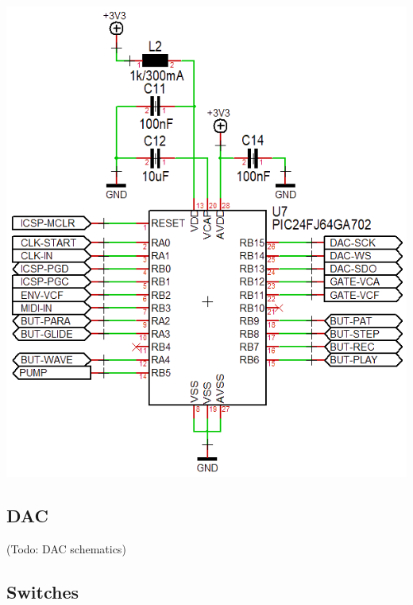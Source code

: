 \documentclass{scrartcl}
\begin{document}
\begin{center}
    \includegraphics[scale=0.55]{assets/schema-mcu.png}
\end{center}

\subsection{DAC}

\begin{center}
    (Todo: DAC schematics)
\end{center}

\subsection{Switches}
\end{document}
